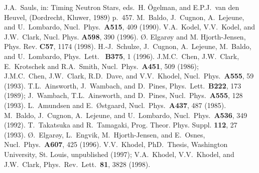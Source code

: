 \documentclass{ws-p9-75x6-50}
\begin{document}
\begin{thebibliography}{99}
J.A.\ Sauls, in: Timing Neutron Stars, 
eds.\ H. \"{O}gelman, and E.P.J.\ van den Heuvel,   
(Dordrecht, Kluwer, 1989) p.\ 457. 
  M.\ Baldo, J.\ Cugnon, A.\ Lejeune, and U.\ Lombardo,
  Nucl.\ Phys.\ {\bf A515}, 409 (1990).
  V.A.\ Kodel, V.V.\ Kodel, and J.W.\ Clark,
  Nucl. Phys. {\bf A598}, 390 (1996).
  \O. Elgar\o y and M. Hjorth-Jensen,
  Phys. Rev.  {\bf C57}, 1174 (1998). 
  H.-J.\ Schulze, J.\ Cugnon, A.\ Lejeune, M.\ Baldo, 
  and U.\ Lombardo, 
  Phys.\ Lett.\  { \bf B375}, 1 (1996). 
  J.M.C.\ Chen, J.W.\ Clark, E.\ Krotschek and R.A.\ Smith,
  Nucl.\ Phys.\ {\bf A451}, 509 (1986);\\
  J.M.C.\ Chen, J.W.\ Clark, R.D.\ Dave, and V.V.\ Khodel,
  Nucl.\ Phys.\ {\bf A555}, 59 (1993).
  T.L.\ Ainsworth, J.\ Wambach, and D.\ Pines,
  Phys.\ Lett.\ {\bf B222}, 173 (1989);
  J.\ Wambach, T.L.\ Ainsworth, and D.\ Pines,
  Nucl.\ Phys.\ {\bf A555}, 128 (1993).
  L.\ Amundsen and E.\ \O stgaard, 
  Nucl.\ Phys.\ {\bf A437}, 487 (1985).
  M.\ Baldo, J.\ Cugnon, A.\ Lejeune, and U.\ Lombardo,
  Nucl.\ Phys.\ {\bf A536}, 349 (1992).
  T.\ Takatsuka and R.\ Tamagaki,
  Prog. Theor. Phys. Suppl. {\bf 112}, 27 (1993).
  \O.\ Elgar\o y, L.\ Engvik, M.\ Hjorth-Jensen, and E.\ Osnes,
  Nucl.\ Phys.\ {\bf A607}, 425 (1996).
  V.V.\ Khodel, PhD.\ Thesis, Washington University, St. Louis, 
  unpublished (1997); 
  V.A.\ Khodel, V.V.\ Khodel, and J.W.\ Clark, 
  Phys.\ Rev.\ Lett.\ {\bf 81}, 3828 (1998). 


\end{thebibliography}
\end{document}

